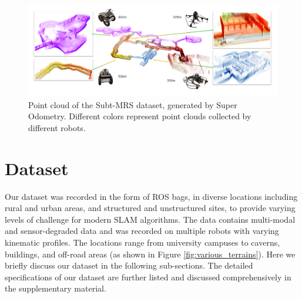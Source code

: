 \documentclass[10pt,twocolumn,letterpaper]{article}
\begin{document}
\begin{figure}[ht!]
    \centering
    \includegraphics[width=0.9\linewidth]{figure/subt_v2.png}
    \caption{Point cloud of the Subt-MRS dataset, generated by Super Odometry\cite{zhao2021super}. Different colors represent point clouds collected by different robots. }
    \label{fig:subt_pointcloud}
\end{figure}


\section{Dataset}\label{sec:dataset}

Our dataset was recorded in the form of ROS bags, in diverse locations including rural and urban areas, and structured and unstructured sites, to provide varying levels of challenge for modern SLAM algorithms. The data contains multi-modal and sensor-degraded data and was recorded on multiple robots with varying kinematic profiles. The locations range from university campuses to caverns, buildings, and off-road areas (as shown in Figure \ref{fig:various_terrains}). Here we briefly discuss our dataset in the following sub-sections. The detailed specifications of our dataset are further listed and discussed comprehensively in the supplementary material.




\end{document}
